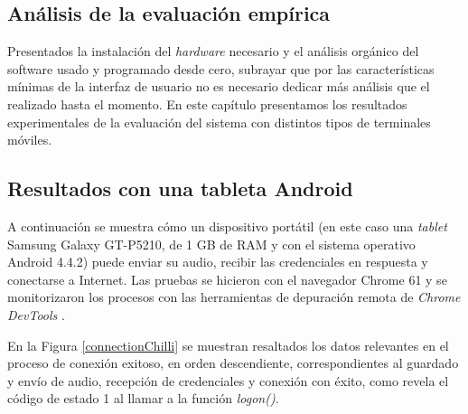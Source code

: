 \clearpage
{}%
\begin{center}
\begin{minipage}{.75\textwidth}
\section{Análisis de la evaluación empírica}

Presentados la instalación del \emph{hardware} necesario y el análisis orgánico del software usado y programado desde cero, subrayar que por las características mínimas de la interfaz de usuario no es necesario dedicar más análisis que el realizado hasta el momento. En este capítulo presentamos los resultados experimentales de la evaluación del sistema con distintos tipos de terminales móviles. %
\end{minipage}
\end{center}
\clearpage%

\subsection{Resultados con una tableta Android}
A continuación se muestra cómo un dispositivo portátil (en este caso una \emph{tablet} Samsung Galaxy GT-P5210, de 1 GB de RAM y con el sistema operativo Android 4.4.2) puede enviar su audio, recibir las credenciales en respuesta y conectarse a Internet. Las pruebas se hicieron con el navegador Chrome 61 y se monitorizaron los procesos con las herramientas de depuración remota de \emph{Chrome DevTools} \cite{ChromeDevTools}.
 
En la Figura \ref{connectionChilli} se muestran resaltados los datos relevantes en el proceso de conexión exitoso, en orden descendiente, correspondientes al guardado y envío de audio, recepción de credenciales y conexión con éxito, como revela el código de estado 1 al llamar a la función \emph{logon()}.

